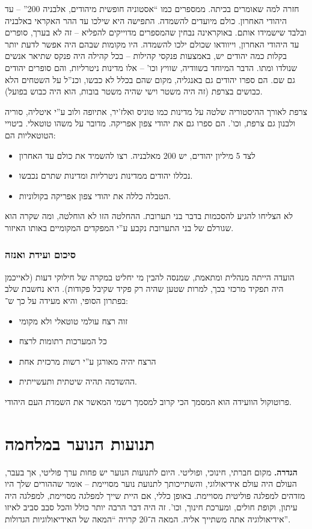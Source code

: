 \documentclass[a4paper]{book}
\begin{document}
	חזרה למה שאומרים בכיתה. ממספרים כמו ``אסטוניה חופשית מיהודים, אלבניה 200'' – עד היהודי האחרון. כולם מיועדים להשמדה. התפישה היא שילכו עד ההר האקראי באלבניה ובלבד שישמידו אותם. באוקראינה נבחין שהמספרים מדוייקים להפליא – זה לא בערך, סופרים עד היהודי האחרון, וייוודאו שכולם ילכו להשמדה. היו מקומות שבהם היה אפשר לדעת יותר בקלות כמה יהודים יש, באמצעות פנקסי קהילות – בכל קהילה היה פנקס שתיאר אנשים שנולדו ומתו. הדבר המיוחד בשוודיה, שוויץ וכו' – אלו מדינות ניטרליות, והם סופרים יהודים גם שם. הם ספרו יהודים גם באנגליה, מקום שהם בכלל לא כבשו, וכנ''ל על השטחים הלא כבושים בצרפת (זה היה משטר וישי שהיה משטר בובות, הוא היה כבוש בפועל). 
	
	צרפת לאורך ההיסטוריה שלטה על מדינות כמו טוניס ואלז'יר, אתיופה ולוב ע''י איטליה, סוריה ולבנון גם צרפת, וכו'. הם ספרו גם את יהודי צפון אפריקה. מדובר על משהו טוטאלי. ביטויי הטוטאליות הם: 
	\begin{itemize}
		\item לצד 5 מיליון יהודים, יש 200 מאלבניה. רצו להשמיד את כולם עד האחרון
		\item נכללו יהודים ממדינות ניטרליות ומדינות שתרם נכבשו. 
		\item הטבלה כללה את יהודי צפון אפריקה בקולוניות. 
	\end{itemize}
	
	לא הצליחו להגיע להסכמות בדבר בני תערובת. ההחלטה הזו לא הוחלטה, ומה שקרה הוא שגורלם של בני התערובת נקבע ע''י המפקדים המקומיים באותו האיזור. 
	
	\subsubsection{סיכום ועידת ואנזה}
	הועדה הייתה מנהלית ומתאמת, שמנסה להבין מי יחליט במקרה של חילוקי דעות (לאייכמן היה תפקיד מרכזי בכך, למרות שטען שהיה רק פקיד שקיבל פקודות). היא נחשבת שלב בפתרון הסופי, והיא מעידה על כך ש־: 
	\begin{itemize}
		\item זוה רצח עולמי טוטאלי ולא מקומי
		\item כל המערכות רתומות לרצח
		\item הרצח יהיה מאורגן ע''י רשות מרכזית אחת
		\item ההשדמה תהיה שיטתית ותעשייתית. 
	\end{itemize}
	
	פרוטוקול הוועידה הוא המסמך הכי קרוב למסמך רשמי המאשר את השמדת העם היהודי. 
	
	\section{תנועות הנוער במלחמה}
	\textbf{הגדרה. }מקום חברתי, חינוכי, ופוליטי. היום לתנועות הנוער יש פחות ערך פוליטי, אך בעבר, העולם היה עולם אידיאולוגי, והשתייכותך לתנועת נוער מסויימת – אומר שההורים שלך היו מזדהים למפלגה פוליטית מסויימת. באופן כללי, אם היית שייך למפלגה מסויימת, למפלגה היה עיתון, וקופת חולים, ומערכת חינוך, וכו'. זה היה דבר הרבה יותר כולל והכל סבב סביב לאיזו אידיאולוגיה אתה משתייך אליה. המאה ה־20 קרויה ``המאה של האידיאולוגיות הגדולות''. 
	
\end{document}
